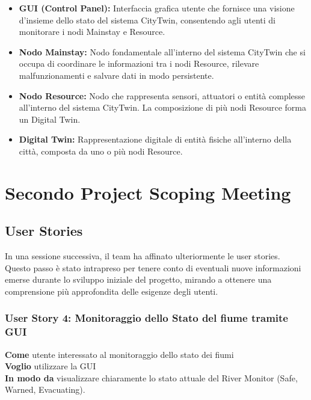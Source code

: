 \begin{itemize}
    \item \textbf{GUI (Control Panel):} Interfaccia grafica utente che fornisce una visione d'insieme dello stato del sistema CityTwin, consentendo agli utenti di monitorare i nodi Mainstay e Resource.
  
    \item \textbf{Nodo Mainstay:} Nodo fondamentale all'interno del sistema CityTwin che si occupa di coordinare le informazioni tra i nodi Resource, rilevare malfunzionamenti e salvare dati in modo persistente.
  
    \item \textbf{Nodo Resource:} Nodo che rappresenta sensori, attuatori o entità complesse all'interno del sistema CityTwin. La composizione di più nodi Resource forma un Digital Twin.
  
    \item \textbf{Digital Twin:} Rappresentazione digitale di entità fisiche all'interno della città, composta da uno o più nodi Resource.
  
  \end{itemize}

\section{Secondo Project Scoping Meeting}

\subsection{User Stories}

In una sessione successiva, il team ha affinato ulteriormente le user stories. Questo passo è stato intrapreso per tenere conto di eventuali nuove informazioni emerse durante lo sviluppo iniziale del progetto, mirando a ottenere una comprensione più approfondita delle esigenze degli utenti.

\subsubsection{User Story 4: Monitoraggio dello Stato del fiume tramite GUI}

\textbf{Come} utente interessato al monitoraggio dello stato dei fiumi \\
\textbf{Voglio} utilizzare la GUI \\
\textbf{In modo da} visualizzare chiaramente lo stato attuale del River Monitor (Safe, Warned, Evacuating).

